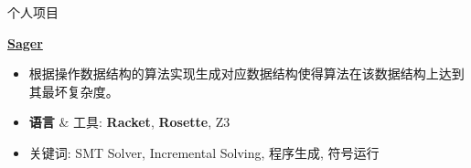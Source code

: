 \documentclass{resume}
\begin{document}
\begin{CJK*}{UTF8}{gbsn}
	\begin{rSection}{个人项目}
	




		\textbf{\href{https://github.com/AD1024/Sager}{Sager}} %
		\vspace{-5pt}
		\begin{itemize}
			\setlength{\itemsep}{1pt}
            \setlength{\parskip}{0pt}
			\setlength{\parsep}{0pt}
			\item 根据操作数据结构的算法实现生成对应数据结构使得算法在该数据结构上达到其最坏复杂度。
			\item \textbf{语言} \& \textsc{工具}: \textbf{Racket}, \textbf{Rosette}, \textsc{Z3}
			\item 关键词: SMT Solver, Incremental Solving, 程序生成, 符号运行
		\end{itemize}
		\vspace{-5pt}


\end{rSection}
\end{CJK*}
\end{document}

